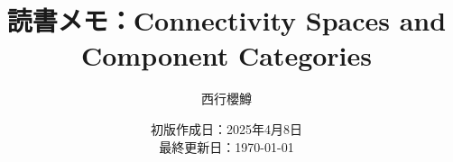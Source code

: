 \newcommand{\CATEGORY}{読書メモ}%
\newcommand{\TITLE}{Connectivity Spaces and Component Categories}
\newcommand{\AUTHORNAME}{西行櫻鱒}
\newcommand{\CREATEDAT}{2025年4月8日}

\title{\CATEGORY：\TITLE}
\author{\AUTHORNAME}
\date{初版作成日：\CREATEDAT\\最終更新日：\today\\}

